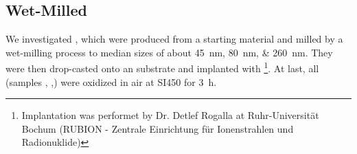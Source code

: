 	\subsection{Wet-Milled \HPHT \Nds}\label{subsec::milled_hpht_nds}
	We investigated \nds, which were produced from a \HPHT starting material and milled by a wet-milling process to median sizes of about \SIlist{45;80;260}{nm}.
	They were then drop-casted onto an \ir substrate and implanted with   \footnote{Implantation was performet by Dr. Detlef Rogalla at Ruhr-Universität Bochum (RUBION - Zentrale Einrichtung für Ionenstrahlen und Radionuklide)}.
	At last, all \HPHT \nds (samples \hphtimpfortyfive, \hphtimpeighty,\hphtimptwosixty) were oxidized in air at SI{450}{\celsius} for \SI{3}{\hour}.
	\\

